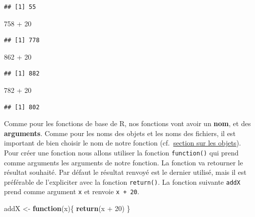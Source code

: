 \documentclass[twoside,symmetric]{book}
\newenvironment{Shaded}{}{}
\newcommand{\ControlFlowTok}[1]{\textbf{#1}}
\newcommand{\DecValTok}[1]{#1}
\newcommand{\KeywordTok}[1]{\textbf{#1}}
\newcommand{\NormalTok}[1]{#1}
\newcommand{\OperatorTok}[1]{#1}
\newcommand{\StringTok}[1]{#1}
\begin{document}
\begin{verbatim}
## [1] 55
\end{verbatim}

\begin{Shaded}
\begin{Highlighting}[]
\DecValTok{758} \OperatorTok{+}\StringTok{ }\DecValTok{20}
\end{Highlighting}
\end{Shaded}

\begin{verbatim}
## [1] 778
\end{verbatim}

\begin{Shaded}
\begin{Highlighting}[]
\DecValTok{862} \OperatorTok{+}\StringTok{ }\DecValTok{20}
\end{Highlighting}
\end{Shaded}

\begin{verbatim}
## [1] 882
\end{verbatim}

\begin{Shaded}
\begin{Highlighting}[]
\DecValTok{782} \OperatorTok{+}\StringTok{ }\DecValTok{20}
\end{Highlighting}
\end{Shaded}

\begin{verbatim}
## [1] 802
\end{verbatim}

Comme pour les fonctions de base de R, nos fonctions vont avoir un \textbf{nom}, et des \textbf{arguments}. Comme pour les noms des objets et les noms des fichiers, il est important de bien choisir le nom de notre fonction (cf.~\protect\hyperlink{l011object}{section sur les objets}). Pour créer une fonction nous allons utiliser la fonction \texttt{function()} qui prend comme arguments les arguments de notre fonction. La fonction va retourner le résultat souhaité. Par défaut le résultat renvoyé est le dernier utilisé, mais il est préférable de l'expliciter avec la fonction \texttt{return()}. La fonction suivante \texttt{addX} prend comme argument \texttt{x} et renvoie \texttt{x\ +\ 20}.

\begin{Shaded}
\begin{Highlighting}[]
\NormalTok{addX <-}\StringTok{ }\ControlFlowTok{function}\NormalTok{(x)\{}
  \KeywordTok{return}\NormalTok{(x }\OperatorTok{+}\StringTok{ }\DecValTok{20}\NormalTok{)}
\NormalTok{\}}
\end{Highlighting}
\end{Shaded}
\end{document}
